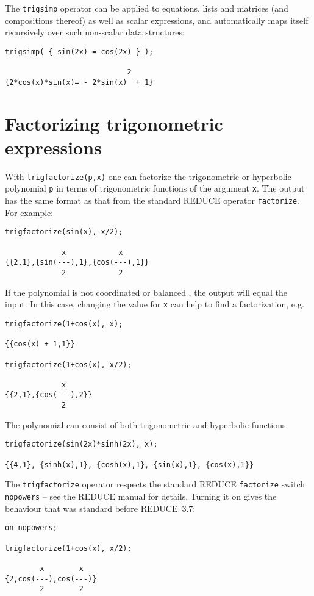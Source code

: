 \documentclass[11pt]{article}
\newcommand{\REDUCE}{REDUCE}
\begin{document}
The \texttt{trigsimp} operator can be applied to equations, lists and
matrices (and compositions thereof) as well as scalar expressions, and
automatically maps itself recursively over such non-scalar data
structures:
\begin{verbatim}
trigsimp( { sin(2x) = cos(2x) } );

                            2
{2*cos(x)*sin(x)= - 2*sin(x)  + 1}
\end{verbatim}


\section{Factorizing trigonometric expressions}

With \texttt{trigfactorize(p,x)} one can factorize the trigonometric
or hyperbolic polynomial \texttt{p} in terms of trigonometric
functions of the argument \texttt{x}.  The output has the same format
as that from the standard \REDUCE{} operator \texttt{factorize}.  For
example:
\begin{verbatim}
trigfactorize(sin(x), x/2);

             x            x
{{2,1},{sin(---),1},{cos(---),1}}
             2            2
\end{verbatim}
If the polynomial is not coordinated or balanced \cite{art}, the
output will equal the input.  In this case, changing the value for
\texttt{x} can help to find a factorization, e.g.
\begin{verbatim}
trigfactorize(1+cos(x), x);

{{cos(x) + 1,1}}

trigfactorize(1+cos(x), x/2);

             x
{{2,1},{cos(---),2}}
             2
\end{verbatim}
The polynomial can consist of both trigonometric and hyperbolic functions:
\begin{verbatim}
trigfactorize(sin(2x)*sinh(2x), x);

{{4,1}, {sinh(x),1}, {cosh(x),1}, {sin(x),1}, {cos(x),1}}
\end{verbatim}

The \texttt{trigfactorize} operator respects the standard \REDUCE{}
\texttt{factorize} switch \texttt{nopowers} -- see the \REDUCE{}
manual for details.  Turning it on gives the behaviour that was
standard before \REDUCE~3.7:
\begin{verbatim}
on nopowers;

trigfactorize(1+cos(x), x/2);

        x        x
{2,cos(---),cos(---)}
        2        2
\end{verbatim}
\end{document}
